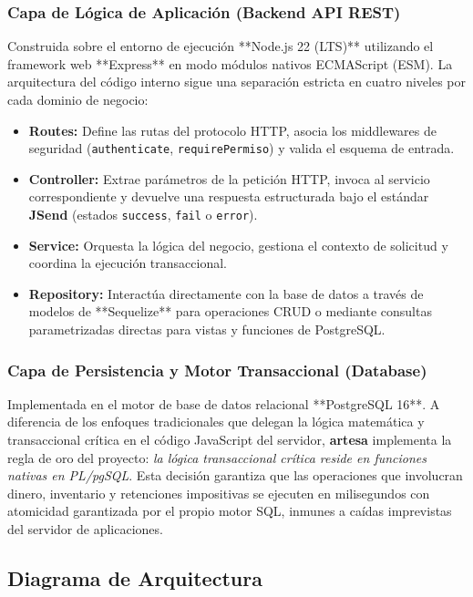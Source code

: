 \subsubsection{Capa de Lógica de Aplicación (Backend API REST)}
Construida sobre el entorno de ejecución **Node.js 22 (LTS)** utilizando el framework web **Express** en modo módulos nativos ECMAScript (ESM). La arquitectura del código interno sigue una separación estricta en cuatro niveles por cada dominio de negocio:
\begin{itemize}
    \item \textbf{Routes:} Define las rutas del protocolo HTTP, asocia los middlewares de seguridad (\texttt{authenticate}, \texttt{requirePermiso}) y valida el esquema de entrada.
    \item \textbf{Controller:} Extrae parámetros de la petición HTTP, invoca al servicio correspondiente y devuelve una respuesta estructurada bajo el estándar \textbf{JSend} (estados \texttt{success}, \texttt{fail} o \texttt{error}).
    \item \textbf{Service:} Orquesta la lógica del negocio, gestiona el contexto de solicitud y coordina la ejecución transaccional.
    \item \textbf{Repository:} Interactúa directamente con la base de datos a través de modelos de **Sequelize** para operaciones CRUD o mediante consultas parametrizadas directas para vistas y funciones de PostgreSQL.
\end{itemize}

\subsubsection{Capa de Persistencia y Motor Transaccional (Database)}
Implementada en el motor de base de datos relacional **PostgreSQL 16**. A diferencia de los enfoques tradicionales que delegan la lógica matemática y transaccional crítica en el código JavaScript del servidor, \textbf{artesa} implementa la regla de oro del proyecto: \textit{la lógica transaccional crítica reside en funciones nativas en PL/pgSQL}. Esta decisión garantiza que las operaciones que involucran dinero, inventario y retenciones impositivas se ejecuten en milisegundos con atomicidad garantizada por el propio motor SQL, inmunes a caídas imprevistas del servidor de aplicaciones.

\subsection{Diagrama de Arquitectura}

